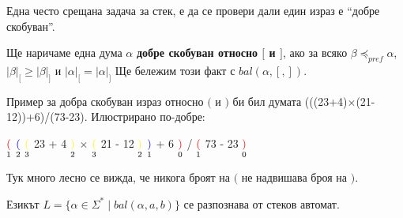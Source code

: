 Една често срещана задача за стек, е да се провери дали един израз е ``добре скобуван''.

\begin{definition}
    Ще наричаме една дума $\alpha$ \textbf{добре скобуван относно $[$ и $]$}, ако за всяко $\beta \preceq_{pref} \alpha$, $|\beta|_[ \geq |\beta|_]$ и $|\alpha|_[ = |\alpha|_]$
    Ще бележим този факт с $bal(\alpha, [, ])$.
\end{definition}

Пример за добра скобуван израз относно $($ и $)$ би бил думата (((23+4)$\times$(21-12))+6)/(73-23).
Илюстрирано по-добре:

\begin{center}
    $\underset{1}{\textcolor{red}{(}}$
    $\underset{2}{\textcolor{blue}{(}}$
    $\underset{3}{\textcolor{yellow}{(}}$
    23
    +
    4
    $\underset{2}{\textcolor{yellow}{)}}$
    $\times$
    $\underset{3}{\textcolor{yellow}{(}}$
    21
    -
    12
    $\underset{2}{\textcolor{yellow}{)}}$
    $\underset{1}{\textcolor{blue}{)}}$
    +
    6
    $\underset{0}{\textcolor{red}{)}}$
    /
    $\underset{1}{\textcolor{red}{(}}$
    73
    -
    23
    $\underset{0}{\textcolor{red}{)}}$
\end{center}

Тук много лесно се вижда, че никога броят на $($ не надвишава броя на $)$.

\begin{claim}
    Езикът $L = \{ \alpha \in \Sigma^* \mid bal(\alpha, a, b) \}$ се разпознава от стеков автомат.
\end{claim}

